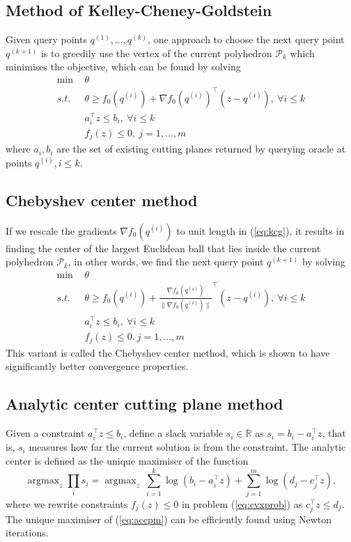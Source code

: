 \documentclass[twocolumn,a4wide,9pt]{extarticle}
\DeclareMathOperator*{\argmax}{argmax}
\newcommand{\eat}[1]{}
\begin{document}
\subsection{Method of Kelley-Cheney-Goldstein}
Given query points $q^{(1)}, \dots, q^{(k)}$, 
one approach to choose the next query point $q^{(k+1)}$ is to greedily use the vertex of the current polyhedron $\mathcal{P}_k$ 
which minimises the objective, which can be found by solving 
\begin{align}
\label{eq:kcg}
\min   ~& \theta  \\
s.t.~~ ~& \theta \ge f_0(q^{(i)}) + \nabla f_0(q^{(i)})^\top (z - q^{(i)}),  ~\forall i \le k \\
     & a_i^\top z \le b_i,  ~\forall i \le k \\
     & f_j(z) \le 0, ~j = 1, \dots, m
\end{align}
where $a_i, b_i$ are the set of existing cutting planes returned by querying oracle at points $q^{(i)}, i \le k$.


\subsection{Chebyshev center method}
If we rescale the gradients $\nabla f_0(q^{(i)})$ to unit length in (\ref{eq:kcg}), 
it results in finding the center of the largest Euclidean ball that lies inside the current polyhedron $\mathcal{P}_k$,
in other words, we find the next query point $q^{(k+1)}$ by solving
\begin{align}
\label{eq:chebyshev}
\min   ~& \theta  \\
s.t.~~ ~& \theta \ge f_0(q^{(i)}) + \frac{\nabla f_0(q^{(i)})}{\|\nabla f_0(q^{(i)})\|} ^\top (z - q^{(i)}), ~\forall i \le k \\
     & a_i^\top z \le b_i, ~\forall i \le k \\
     & f_j(z) \le 0. ~j = 1, \dots, m
\end{align}
This variant is called the Chebyshev center method, which is shown to have significantly better convergence properties.
\eat{citation}


\subsection{Analytic center cutting plane method}
Given a constraint $a_i^\top z \le b_i$, define a slack variable $s_i \in \mathbb{R}$ as $s_i = b_i - a_i^\top z$,
that is, $s_i$ measures how far the current solution is from the constraint.
The analytic center is defined as the unique maximiser of the function
\begin{equation}
\label{eq:accpm}
\argmax_z \prod_i s_i = \argmax_z ~ \sum_{i=1}^k \log(b_i - a_i^\top z) + \sum_{j=1}^m \log(d_j - c_j^\top z),
\end{equation}
where we rewrite constraints $f_j(z) \le 0$ in problem (\ref{eq:cvxprob}) as $c_j^\top z \le d_j$.
The unique maximiser of (\ref{eq:accpm}) can be efficiently found using Newton iterations.
\end{document}
